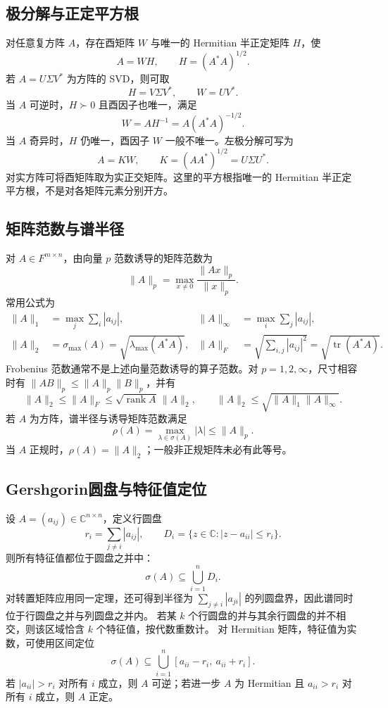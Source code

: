 \documentclass[../main.tex]{subfiles}
\begin{document}
\subsection{极分解与正定平方根}
对任意复方阵 $A$，存在酉矩阵 $W$ 与唯一的 Hermitian 半正定矩阵 $H$，使
\[
A=WH,\qquad H=(A^*A)^{1/2}.
\]
若 $A=U\Sigma V^*$ 为方阵的 SVD，则可取
\[
H=V\Sigma V^*,\qquad W=UV^*.
\]
当 $A$ 可逆时，$H\succ0$ 且酉因子也唯一，满足
\[
W=AH^{-1}=A(A^*A)^{-1/2}.
\]
当 $A$ 奇异时，$H$ 仍唯一，酉因子 $W$ 一般不唯一。左极分解可写为
\[
A=KW,\qquad K=(AA^*)^{1/2}=U\Sigma U^*.
\]
对实方阵可将酉矩阵取为实正交矩阵。这里的平方根指唯一的 Hermitian 半正定平方根，不是对各矩阵元素分别开方。
\subsection{矩阵范数与谱半径}
对 $A\in F^{m\times n}$，由向量 $p$ 范数诱导的矩阵范数为
\[
\|A\|_p=\max_{x\ne0}\frac{\|Ax\|_p}{\|x\|_p}.
\]
常用公式为
\begin{align*}
\|A\|_1&=\max_j\sum_i|a_{ij}|, &
\|A\|_\infty&=\max_i\sum_j|a_{ij}|,\\
\|A\|_2&=\sigma_{\max}(A)=\sqrt{\lambda_{\max}(A^*A)}, &
\|A\|_F&=\sqrt{\sum_{i,j}|a_{ij}|^2}=\sqrt{\operatorname{tr}(A^*A)}.
\end{align*}
Frobenius 范数通常不是上述向量范数诱导的算子范数。对 $p=1,2,\infty$，尺寸相容时有 $\|AB\|_p\le\|A\|_p\|B\|_p$，并有
\[
\|A\|_2\le\|A\|_F\le\sqrt{\operatorname{rank}A}\,\|A\|_2,\qquad
\|A\|_2\le\sqrt{\|A\|_1\|A\|_\infty}.
\]
若 $A$ 为方阵，谱半径与诱导矩阵范数满足
\[
\rho(A)=\max_{\lambda\in\sigma(A)}|\lambda|\le\|A\|_p.
\]
当 $A$ 正规时，$\rho(A)=\|A\|_2$；一般非正规矩阵未必有此等号。
\subsection{Gershgorin圆盘与特征值定位}
设 $A=(a_{ij})\in\mathbb C^{n\times n}$，定义行圆盘
\[
r_i=\sum_{j\ne i}|a_{ij}|,\qquad
D_i=\{z\in\mathbb C:|z-a_{ii}|\le r_i\}.
\]
则所有特征值都位于圆盘之并中：
\[
\sigma(A)\subseteq\bigcup_{i=1}^nD_i.
\]
对转置矩阵应用同一定理，还可得到半径为 $\sum_{j\ne i}|a_{ji}|$ 的列圆盘界，因此谱同时位于行圆盘之并与列圆盘之并内。
若某 $k$ 个行圆盘的并与其余行圆盘的并不相交，则该区域恰含 $k$ 个特征值，按代数重数计。
对 Hermitian 矩阵，特征值为实数，可使用区间定位
\[
\sigma(A)\subseteq\bigcup_{i=1}^n[a_{ii}-r_i,\ a_{ii}+r_i].
\]
若 $|a_{ii}|>r_i$ 对所有 $i$ 成立，则 $A$ 可逆；若进一步 $A$ 为 Hermitian 且 $a_{ii}>r_i$ 对所有 $i$ 成立，则 $A$ 正定。
\end{document}
